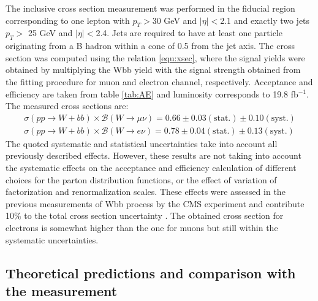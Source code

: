 The inclusive cross section measurement was performed in the fiducial region corresponding to one lepton with $p_T>$30 GeV and $|\eta|<$2.1 and exactly two jets $p_T>$ 25 GeV and $|\eta|<$2.4. Jets are required to have at least one particle originating from a B hadron within a cone of 0.5 from the jet axis. The cross section was computed using the relation \ref{equ:xsec}, where the signal yields were obtained by multiplying the Wbb yield with the signal strength obtained from the fitting procedure for muon and electron channel, respectively. Acceptance and efficiency are taken from table \ref{tab:AE} and luminosity corresponds to 19.8 fb$^{-1}$. The measured cross sections are:
\begin{align*}
\sigma(pp\rightarrow W+bb)\times \mathcal{B}(W\rightarrow \mu\nu) = 0.66 \pm 0.03(\mathrm{stat.}) \pm 0.10(\mathrm{syst.})\\
\sigma(pp\rightarrow W+bb)\times \mathcal{B}(W\rightarrow e\nu) = 0.78 \pm 0.04(\mathrm{stat.}) \pm 0.13(\mathrm{syst.})
\end{align*}
The quoted systematic and statistical uncertainties take into account all previously described effects. However, these results are not taking into account the systematic effects on the acceptance and efficiency calculation of different choices for the parton distribution functions, or the effect of variation of factorization and renormalization scales. These effects were assessed in the previous measurements of Wbb process by the CMS experiment and contribute 10\% to the total cross section uncertainty \cite{Chatrchyan:2013uza}. The obtained cross section for electrons is somewhat higher than the one for muons but still within the systematic uncertainties.   

\subsection{Theoretical predictions and comparison with the measurement}

